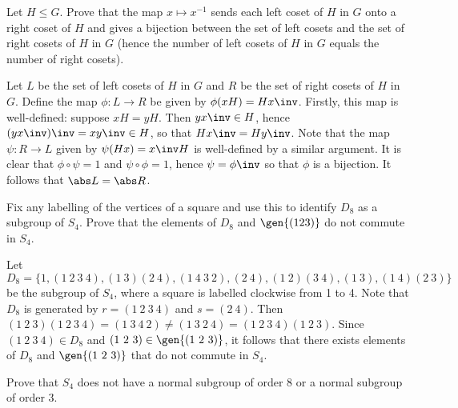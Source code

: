\begin{exercise}\label{ex3.2.12}
    Let $H \leq G$. Prove that the map $x \mapsto x^{-1}$ sends each left coset of $H$ in $G$ onto a right coset of $H$ and gives a bijection between the set of left cosets and the set of right cosets of $H$ in $G$ (hence the number of left cosets of $H$ in $G$ equals the number of right cosets).
\end{exercise}

\begin{sol}
    Let $L$ be the set of left cosets of $H$ in $G$ and $R$ be the set of right cosets of $H$ in $G$. Define the map $\phi : L \to R$ be given by $\phi(xH) = Hx\inv$. Firstly, this map is well-defined: suppose $xH = yH$. Then $yx\inv \in H$, hence $(yx\inv)\inv = xy\inv \in H$, so that $Hx\inv = Hy\inv$. Note that the map $\psi : R \to L$ given by $\psi(Hx) = x\inv H$ is well-defined by a similar argument. It is clear that $\phi \circ \psi = 1$ and $\psi \circ \phi = 1$, hence $\psi = \phi\inv$ so that $\phi$ is a bijection. It follows that $\abs L = \abs R$.
\end{sol}

\begin{exercise}\label{ex3.2.13}
    Fix any labelling of the vertices of a square and use this to identify $D_8$ as a subgroup of $S_4$. Prove that the elements of $D_8$ and $\gen{(123)}$ do not commute in $S_4$.
\end{exercise}

\begin{sol}
    Let 
    \[D_8 = \{1, (1\ 2\ 3\ 4), (1\ 3)(2\ 4), (1\ 4\ 3\ 2), (2\ 4), (1\ 2)(3\ 4), (1\ 3), (1\ 4)(2\ 3)\}\]
    be the subgroup of $S_4$, where a square is labelled clockwise from 1 to 4. Note that $D_8$ is generated by $r = (1\ 2\ 3\ 4)$ and $s = (2\ 4)$. Then $(1\ 2\ 3)(1\ 2\ 3\ 4) = (1\ 3\ 4\ 2) \neq (1\ 3\ 2\ 4) = (1\ 2\ 3\ 4)(1\ 2\ 3)$. Since $(1\ 2\ 3\ 4) \in D_8$ and $(1\ 2\ 3) \in \gen{(1\ 2\ 3)}$, it follows that there exists elements of $D_8$ and $\gen{(1\ 2\ 3)}$ that do not commute in $S_4$.
\end{sol}

\begin{exercise}\label{ex3.2.14}
    Prove that $S_4$ does not have a normal subgroup of order 8 or a normal subgroup of order 3.
\end{exercise}

